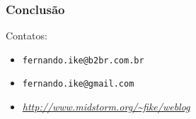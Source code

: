 \documentclass{beamer}
\begin{document}
\begin{frame}
    \frametitle{\textbf{Conclusão}}
    \begin{exampleblock}{Contatos:}
        \begin{itemize}
            \item {\texttt{fernando.ike@b2br.com.br}}
            \item {\texttt{fernando.ike@gmail.com}}
            \item {\textit{\url{ http://www.midstorm.org/~fike/weblog}}}
        \end{itemize}
    \end{exampleblock}

\end{frame}
\end{document}
